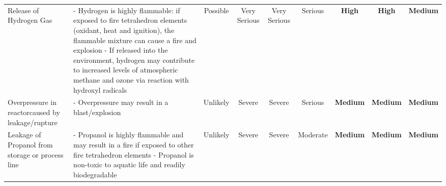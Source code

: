 \begin{landscape}
\begin{table}
\begin{tabularx}{\linewidth}{|X|X|c|c|c|c|c|c|c|}
Release of  Hydrogen Gas                                                       & - Hydrogen is highly flammable: if exposed     to fire tetrahedron elements (oxidant, heat    and ignition), the flammable mixture can      cause a fire and explosion  - If released into the environment, hydrogen     may contribute to increased levels of     atmospheric methane and ozone via reaction     with hydroxyl radicals & Possible                              & Very  Serious       & Very Serious          & Serious                                                               & \cellcolor[HTML]{FD6864}\textbf{High}                         & \cellcolor[HTML]{FD6864}\textbf{High}                           & \cellcolor[HTML]{FCFF2F}\textbf{Medium}                                 \\
Overpressure in  reactorcaused by  leakage/rupture                           & - Overpressure may result in a blast/explosion                                                                                                                                                                                                                                                                                                                                                 & Unlikely                              & Severe                                                        & Severe                                                          & Serious                                                               & \cellcolor[HTML]{FCFF2F}\textbf{Medium}                       & \cellcolor[HTML]{FCFF2F}\textbf{Medium}                         & \cellcolor[HTML]{FCFF2F}\textbf{Medium}                                 \\
Leakage of Propanol  from storage or  process line                           & - Propanol is highly flammable and may result in    a fire if exposed to other fire tetrahedron elements - Propanol is non-toxic to aquatic life and readily     biodegradable                                                                                                                                                                   & Unlikely                              & Severe                                                        & Severe                                                          & Moderate                                                              & \cellcolor[HTML]{FCFF2F}\textbf{Medium}                       & \cellcolor[HTML]{FCFF2F}\textbf{Medium}                         & \cellcolor[HTML]{FCFF2F}\textbf{Medium}                                 \\

\end{tabularx}
\end{table}
\end{landscape}

